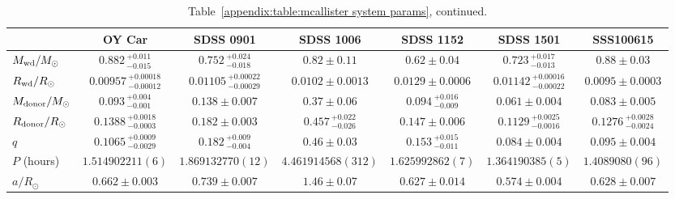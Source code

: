 \begin{landscape}
    \begin{table}
        \caption{Table~\ref{appendix:table:mcallister system params}, continued.}
        \label{appendix:table:mcallister system params cont 1}
        \begin{tabular}{lcccccc}
            \hline
            ~                           & \textbf{OY Car}                   & \textbf{SDSS 0901}                    & \textbf{SDSS 1006}            & \textbf{SDSS 1152}            & \textbf{SDSS 1501}                                        & \textbf{SSS100615}                \\
            \hline
            \hline
            $M_{\rm wd}/M_{\odot}$      & $0.882\,^{+0.011}_{-0.015}$       & $0.752\,^{+0.024}_{-0.018}$           & $0.82\pm0.11$                 & $0.62\pm0.04$                 & $0.723\,^{+0.017}_{-0.013}$                               & $0.88\pm0.03$                     \\
            $R_{\rm wd}/R_{\odot}$      & $0.00957\,^{+0.00018}_{-0.00012}$ & $0.01105\,^{+0.00022}_{-0.00029}$     & $0.0102\pm0.0013$             & $0.0129\pm0.0006$             & $0.01142\,^{+0.00016}_{-0.00022}$                         & $0.0095\pm0.0003$                 \\
            $M_{\rm donor}/M_{\odot}$   & $0.093\,^{+0.004}_{-0.001}$       & $0.138\pm0.007$                       & $0.37\pm0.06$                 & $0.094\,^{+0.016}_{-0.009}$   & $0.061\pm0.004$                                           & $0.083\pm0.005$                   \\
            $R_{\rm donor}/R_{\odot}$   & $0.1388\,^{+0.0018}_{-0.0003}$    & $0.182\pm0.003$                       & $0.457\,^{+0.022}_{-0.026}$   & $0.147\pm0.006$               & $0.1129\,^{+0.0025}_{-0.0016}$                            & $0.1276\,^{+0.0028}_{-0.0024}$    \\
            $q$                         & $0.1065\,^{+0.0009}_{-0.0029}$    & $0.182\,^{+0.009}_{-0.004}$           & $0.46\pm0.03$                 & $0.153\,^{+0.015}_{-0.011}$   & $0.084\pm0.004$                                           & $0.095\pm0.004$                   \\
            \hline
            $P$ (hours)                  & $1.514902211(6)$                  & $1.869132770(12)$                     & $4.461914568(312)$            & $1.625992862(7)$              & $1.364190385(5)$                                          & $1.4089080(96)$                   \\
            $a/R_{\odot}$               & $0.662\pm0.003$                   & $0.739\pm0.007$                       & $1.46\pm0.07$                 & $0.627\pm0.014$               & $0.574\pm0.004$                                           & $0.628\pm0.007$                   \\

\end{tabular}
\end{table}
\end{landscape}
